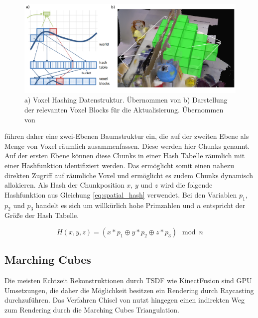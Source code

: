 \begin{figure}
  \centering
	\includegraphics[width=1.0\textwidth]{content/images/methods/hashing.png} 
  \caption{a) Voxel Hashing Datenstruktur. Übernommen von \citet{niessner2013real} b) Darstellung der relevanten Voxel Blocks für die Aktualisierung. Übernommen von \citet{Klingensmith_2015_7924}}
  \label{fig:hashing}
\end{figure}

\citet{niessner2013real} führen daher eine zwei-Ebenen Baumstruktur ein, die auf der zweiten Ebene als Menge von Voxel räumlich zusammenfassen. Diese werden hier Chunks genannt. Auf der ersten Ebene können diese Chunks in einer Hash Tabelle räumlich mit einer Hashfunktion identifiziert werden. Das ermöglicht somit einen nahezu direkten Zugriff auf räumliche Voxel und ermöglicht es zudem Chunks dynamisch allokieren. Als Hash der Chunkposition \(x\), \(y\) und \(z\) wird die folgende Hashfunktion aus Gleichung \ref{eq:spatial_hash} verwendet. Bei den Variablen \(p_1\), \(p_2\) und \(p_3\) handelt es sich um willkürlich hohe Primzahlen und \(n\) entspricht der Größe der Hash Tabelle.

\begin{equation}\label{eq:spatial_hash}
H(x,y,z) = (x * p_1 \oplus y * p_2 \oplus z * p_3) \mod n
\end{equation}

\subsection{Marching Cubes}

Die meisten Echtzeit Rekonstruktionen durch TSDF wie KinectFusion sind GPU Umsetzungen, die daher die Möglichkeit besitzen ein Rendering durch Raycasting durchzuführen. Das Verfahren Chisel von \citet{Klingensmith_2015_7924} nutzt hingegen einen indirekten Weg zum Rendering durch die Marching Cubes Triangulation.

